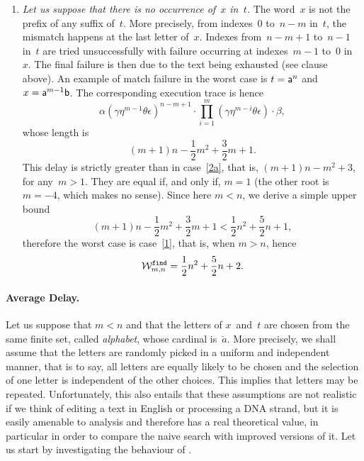 \begin{enumerate}
\begin{enumerate}
  \item \emph{Let us suppose that there is no occurrence of~\(x\)
    in~\(t\).} The word~\(x\) is not the prefix of any suffix
    of~\(t\). More precisely, from indexes~\(0\) to~\(n-m\) in~\(t\),
    the mismatch happens at the last letter of~\(x\). Indexes
    from~\({n-m+1}\) to~\(n-1\) in~\(t\) are tried unsuccessfully with
    failure occurring at indexes~\({m-1}\) to~\(0\) in~\(x\). The
    final failure is then due to the text being exhausted (see
    clause~\clause{\beta} above). An example of match failure in the
    worst case is \(t = \word{a}^{n}\) and \(x =
    \word{a}^{m-1}\word{b}\). The corresponding execution trace is
    hence
    \[
    \alpha
    (\gamma\eta^{m-1}\theta\epsilon)^{n-m+1} \cdot
    \prod_{i=1}^{m}(\gamma\eta^{m-i}\theta\epsilon) \cdot
    \beta,
    \]
    whose length is
    \[
      (m+1)n - \frac{1}{2}{m^2} + \frac{3}{2}{m} + 1.
    \]
    This delay is strictly greater than in case~\ref{2a}, that is,
    \((m+1)n-m^2+3\), for any~\({m>1}\). They are equal if, and only
    if, \(m=1\) (the other root is \({m=-4}\), which makes no
    sense). Since here \({m < n}\), we derive a simple upper bound
    \[
     (m+1)n - \frac{1}{2}{m^2} + \frac{3}{2}{m} + 1
     < \frac{1}{2}{n^2} + \frac{5}{2}{n} + 1,
    \]
    therefore the worst case is case~\ref{1}, that is, when \({m>n}\),
    hence
    \[
    \worst{find}{m,n} = \frac{1}{2}{n^2} + \frac{5}{2}{n} + 2.
    \]
    \end{enumerate}
\end{enumerate}

\medskip

\paragraph{Average Delay.} Let us suppose that \({m < n}\) and that the
letters of \(x\)~and~\(t\) are chosen from the same finite set, called
\emph{alphabet}, whose cardinal is~\(\breve{a}\). More precisely, we
shall assume that the letters are randomly picked in a uniform and
independent manner, that is to say, all letters are equally likely to
be chosen and the selection of one letter is independent of the other
choices. This implies that letters may be repeated. Unfortunately,
this also entails that these assumptions are not realistic if we think
of editing a text in English or processing a DNA strand, but it is
easily amenable to analysis and therefore has a real theoretical
value, in particular in order to compare the naive search with
improved versions of it. Let us start by investigating the behaviour of
.

